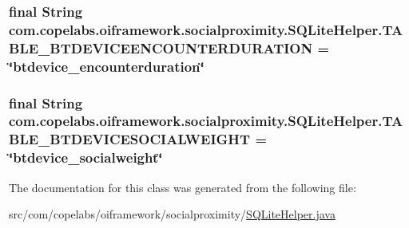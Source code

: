 \subsubsection[{T\+A\+B\+L\+E\+\_\+\+B\+T\+D\+E\+V\+I\+C\+E\+E\+N\+C\+O\+U\+N\+T\+E\+R\+D\+U\+R\+A\+T\+I\+O\+N}]{\setlength{\rightskip}{0pt plus 5cm}final String com.\+copelabs.\+oiframework.\+socialproximity.\+S\+Q\+Lite\+Helper.\+T\+A\+B\+L\+E\+\_\+\+B\+T\+D\+E\+V\+I\+C\+E\+E\+N\+C\+O\+U\+N\+T\+E\+R\+D\+U\+R\+A\+T\+I\+O\+N = \char`\"{}btdevice\+\_\+encounterduration\char`\"{}\hspace{0.3cm}{\ttfamily [static]}}\label{classcom_1_1copelabs_1_1oiframework_1_1socialproximity_1_1_s_q_lite_helper_ab31b56a0eac0e440f57ad05a777f42be}
\hypertarget{classcom_1_1copelabs_1_1oiframework_1_1socialproximity_1_1_s_q_lite_helper_ad91da6d89af9550e074a14a62f3366b1}{}
\subsubsection[{T\+A\+B\+L\+E\+\_\+\+B\+T\+D\+E\+V\+I\+C\+E\+S\+O\+C\+I\+A\+L\+W\+E\+I\+G\+H\+T}]{\setlength{\rightskip}{0pt plus 5cm}final String com.\+copelabs.\+oiframework.\+socialproximity.\+S\+Q\+Lite\+Helper.\+T\+A\+B\+L\+E\+\_\+\+B\+T\+D\+E\+V\+I\+C\+E\+S\+O\+C\+I\+A\+L\+W\+E\+I\+G\+H\+T = \char`\"{}btdevice\+\_\+socialweight\char`\"{}\hspace{0.3cm}{\ttfamily [static]}}\label{classcom_1_1copelabs_1_1oiframework_1_1socialproximity_1_1_s_q_lite_helper_ad91da6d89af9550e074a14a62f3366b1}


The documentation for this class was generated from the following file\+:\begin{DoxyCompactItemize}
\item 
src/com/copelabs/oiframework/socialproximity/\hyperlink{_s_q_lite_helper_8java}{S\+Q\+Lite\+Helper.\+java}\end{DoxyCompactItemize}
